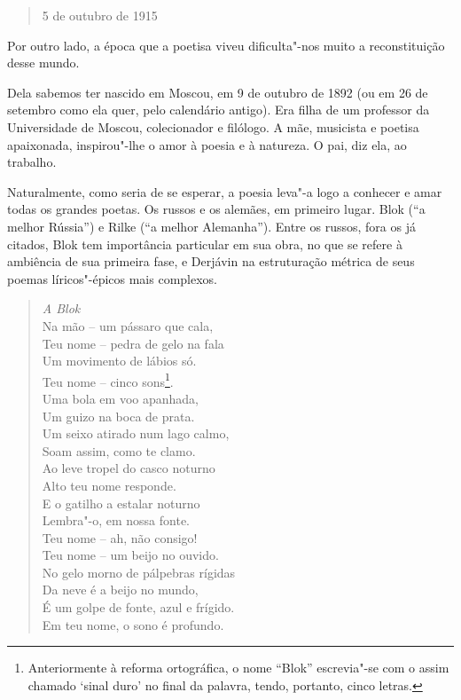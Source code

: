 {\begin{verse}
5 de outubro de 1915

\end{verse}

Por outro lado, a época que a poetisa viveu dificulta"-nos muito a
reconstituição desse mundo.

Dela sabemos ter nascido em Moscou, em 9 de outubro de 1892 (ou em 26 de
setembro como ela quer, pelo calendário antigo). Era filha de um
professor da Universidade de Moscou, colecionador e filólogo. A mãe,
musicista e poetisa apaixonada, inspirou"-lhe o amor à poesia e à
natureza. O pai, diz ela, ao trabalho.

Naturalmente, como seria de se esperar, a poesia leva"-a logo a conhecer
e amar todas os grandes poetas. Os russos e os alemães, em primeiro
lugar. Blok (``a melhor Rússia'') e Rilke (``a melhor Alemanha''). Entre
os russos, fora os já citados, Blok tem importância particular em sua
obra, no que se refere à ambiência de sua primeira fase, e Derjávin na
estruturação métrica de seus poemas líricos"-épicos mais complexos.

\begin{verse}
\emph{A Blok} \\[8pt]
Na mão -- um pássaro que cala, \\
Teu nome -- pedra de gelo na fala \\
Um movimento de lábios só. \\[8pt]
Teu nome -- cinco sons\footnote{Anteriormente à reforma ortográfica, o
  nome ``Blok'' escrevia"-se com o assim chamado `sinal duro' no final da
  palavra, tendo, portanto, cinco letras.}. \\
Uma bola em voo apanhada, \\
Um guizo na boca de prata. \\
Um seixo atirado num lago calmo, \\
Soam assim, como te clamo. \\
Ao leve tropel do casco noturno \\
Alto teu nome responde. \\
E o gatilho a estalar noturno \\
Lembra"-o, em nossa fonte. \\[8pt]
Teu nome -- ah, não consigo! \\
Teu nome -- um beijo no ouvido. \\
No gelo morno de pálpebras rígidas \\
Da neve é a beijo no mundo, \\
É um golpe de fonte, azul e frígido. \\
Em teu nome, o sono é profundo. 


\end{verse}}
